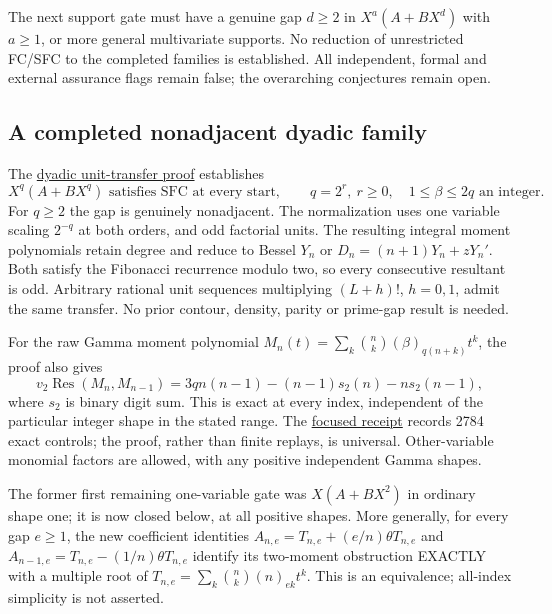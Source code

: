 \documentclass[11pt]{article}
\begin{document}
The next support gate must have a genuine gap $d\ge2$ in
$X^a(A+BX^d)$ with $a\ge1$, or more general multivariate supports.
No reduction of unrestricted FC/SFC to the completed families is
established. All independent, formal and external assurance flags
remain false; the overarching conjectures remain open.

\subsection*{A completed nonadjacent dyadic family}
The \href{DYADIC_BINOMIAL_SFC.tex}{dyadic unit-transfer proof} establishes
\[
 X^q(A+BX^q)\text{ satisfies SFC at every start},\qquad
 q=2^r,\ r\ge0,\quad1\le\beta\le2q\text{ an integer}.
\]
For $q\ge2$ the gap is genuinely nonadjacent. The normalization uses one
variable scaling $2^{-q}$ at both orders, and odd factorial units. The
resulting integral moment polynomials retain degree and reduce to Bessel
$Y_n$ or $D_n=(n+1)Y_n+zY_n'$. Both satisfy the Fibonacci recurrence
modulo two, so every consecutive resultant is odd. Arbitrary rational
unit sequences multiplying $(L+h)!$, $h=0,1$, admit the same transfer.
No prior contour, density, parity or prime-gap result is needed.

For the raw Gamma moment polynomial
$M_n(t)=\sum_k\binom nk(\beta)_{q(n+k)}t^k$, the proof also gives
\[
 v_2\operatorname{Res}(M_n,M_{n-1})
 =3qn(n-1)-(n-1)s_2(n)-ns_2(n-1),
\]
where $s_2$ is binary digit sum. This is exact at every index, independent
of the particular integer shape in the stated range.
The \href{dyadic_binomial_sfc_verification.json}{focused receipt} records
2784 exact controls; the proof, rather than finite replays, is universal.
Other-variable monomial factors are allowed, with any positive independent
Gamma shapes.

The former first remaining one-variable gate was $X(A+BX^2)$ in ordinary shape
one; it is now closed below, at all positive shapes. More generally, for every gap $e\ge1$, the new coefficient identities
$A_{n,e}=T_{n,e}+(e/n)\theta T_{n,e}$ and
$A_{n-1,e}=T_{n,e}-(1/n)\theta T_{n,e}$ identify its two-moment
obstruction EXACTLY with a multiple root of
$T_{n,e}=\sum_k\binom nk(n)_{ek}t^k$. This is an equivalence;
all-index simplicity is not asserted.
\end{document}

